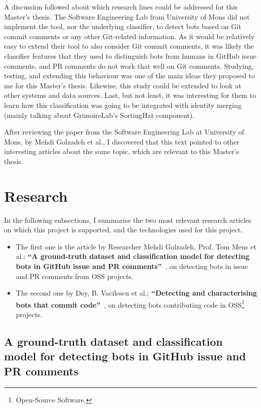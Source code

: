 \documentclass[a4paper, 12pt]{book}
\begin{document}
A discussion followed about which research lines could be addressed for this Master's thesis. The Software Engineering Lab from University of Mons did not implement the tool, nor the underlying classifier, to detect bots based on Git commit comments or any other Git-related information. As it would be relatively easy to extend their tool to also consider Git commit comments, it was likely the classifier features that they used to distinguish bots from humans in GitHub issue comments, and PR comments do not work that well on Git comments. Studying, testing, and extending this behaviour was one of the main ideas they proposed to me for this Master's thesis. Likewise, this study could be extended to look at other systems and data sources. Last, but not least, it was interesting for them to learn how this classification was going to be integrated with identity merging (mainly talking about GrimoireLab's SortingHat component).

After reviewing the paper from the Software Engineering Lab at University of Mons, by Mehdi Golzadeh et al., I discovered that this text pointed to other interesting articles about the same topic, which are relevant to this Master's thesis.

\section{Research}
\label{sec:research}

In the following subsections, I summarise the two most relevant research articles on which this project is supported, and the technologies used for this project.

\begin{itemize}
    \item The first one is the article by Researcher Mehdi Golzadeh, Prof. Tom Mens et al.: \textbf{``A ground-truth dataset and classification model for detecting bots in GitHub issue and PR comments''}~\cite{golzadeh-mens-ground-truth-github2021}, on detecting bots in issue and PR comments from OSS projects.
    
    \item The second one by Dey, B. Vacilescu et al.: \textbf{``Detecting and characterising bots that commit code''}~\cite{dey-et-al-detecting-bots}, on detecting bots contributing code in OSS\footnote{Open-Source Software.} projects.
\end{itemize}

\subsection{A ground-truth dataset and classification model for detecting bots in GitHub issue and PR comments}
\label{ssec:golzadeh}
\end{document}
